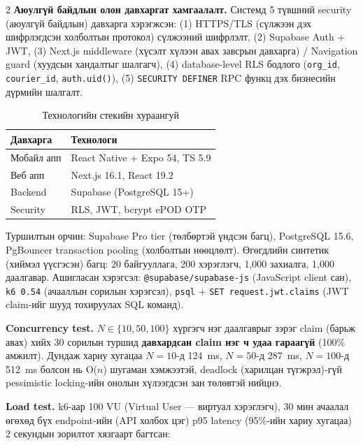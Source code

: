 \begin{multicols}{2}
\textbf{Аюулгүй байдлын олон давхаргат хамгаалалт.} Системд 5 түвшний security (аюулгүй байдлын) давхарга хэрэгжсэн: (1) HTTPS/TLS (сүлжээн дэх шифрлэгдсэн холболтын протокол) сүлжээний шифрлэлт, (2) Supabase Auth + JWT, (3) Next.js middleware (хүсэлт хүлээн авах завсрын давхарга) / Navigation guard (хуудсын хандалтыг шалгагч), (4) database-level RLS бодлого (\texttt{org\_id}, \texttt{courier\_id}, \texttt{auth.uid()}), (5) \texttt{SECURITY DEFINER} RPC функц дэх бизнесийн дүрмийн шалгалт.

\begin{table}[H]
\centering
\caption{Технологийн стекийн хураангуй}
\label{tab:tovchlol_stack}
\scriptsize
\setlength{\tabcolsep}{2.5pt}
\begin{tabular}{|l|l|}
\hline
\textbf{Давхарга} & \textbf{Технологи} \\ \hline
Мобайл апп & React Native + Expo 54, TS 5.9 \\ \hline
Веб апп & Next.js 16.1, React 19.2 \\ \hline
Backend & Supabase (PostgreSQL 15+) \\ \hline
Security & RLS, JWT, bcrypt ePOD OTP \\ \hline
\end{tabular}
\end{table}

Туршилтын орчин: Supabase Pro tier (төлбөртэй үндсэн багц), PostgreSQL 15.6, PgBouncer transaction pooling (холболтын нөөцлөлт). Өгөгдлийн синтетик (хиймэл үүсгэсэн) багц: 20 байгууллага, 200 хэрэглэгч, 1,000 захиалга, 1,000 даалгавар. Ашигласан хэрэгсэл: \texttt{@supabase/supabase-js} (JavaScript client сан), \texttt{k6 0.54} (ачааллын сорилын хэрэгсэл), \texttt{psql} + \texttt{SET request.jwt.claims} (JWT claim-ийг шууд тохируулах SQL команд).


\textbf{Concurrency test.} $N \in \{10, 50, 100\}$ хүргэгч нэг даалгаврыг зэрэг claim (барьж авах) хийх 30 сорилын туршид \textbf{давхардсан claim нэг ч удаа гараагүй} (100\% амжилт). Дундаж хариу хугацаа $N{=}10$-д 124~ms, $N{=}50$-д 287~ms, $N{=}100$-д 512~ms болсон нь O($n$) шугаман хэмжээтэй, deadlock (харилцан түгжрэл)-гүй pessimistic locking-ийн онолын хүлээгдсэн зан төлөвтэй нийцнэ.

\textbf{Load test.} k6-аар 100 VU (Virtual User --- виртуал хэрэглэгч), 30 мин ачаалал өгөхөд бүх endpoint-ийн (API холбох цэг) p95 latency (95\%-ийн хариу хугацаа) 2 секундын зорилтот хязгаарт багтсан:
\end{multicols}

